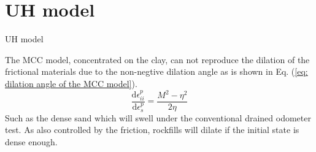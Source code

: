 \documentclass[aspectratio=169]{beamer}
\begin{document}
\section{UH model}
\begin{frame}{UH model}
    \begin{minipage}{0.58\linewidth}
        The MCC model, concentrated on the clay, can not reproduce the dilation of the frictional materials due to the non-negtive dilation angle as is shown in Eq. (\ref{eq: dilation angle of the MCC model}). 
        \begin{equation}
            \frac{\mathrm{d}\epsilon_{ii}^p}{\mathrm{d}\epsilon_{s}^p} = \frac{M^2-\eta^2}{2\eta}
            \label{eq: dilation angle of the MCC model}
        \end{equation}
        \vspace{-1mm}
        Such as the dense sand which will swell under the conventional drained odometer test. As also controlled by the friction, rockfills will dilate if the initial state is dense enough. 
        

\end{minipage}
\end{frame}
\end{document}
